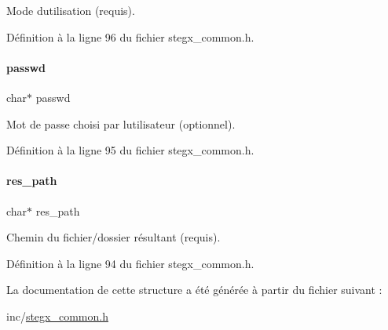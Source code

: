 Mode d\textquotesingle{}utilisation (requis). 

Définition à la ligne 96 du fichier stegx\+\_\+common.\+h.

\mbox{\label{a00142_a3b8cb37fa26cdca2b7460e14facd9ec0}} 
\paragraph{\texorpdfstring{passwd}{passwd}}
{\footnotesize\ttfamily char$\ast$ passwd}

Mot de passe choisi par l\textquotesingle{}utilisateur (optionnel). 

Définition à la ligne 95 du fichier stegx\+\_\+common.\+h.

\mbox{\label{a00142_a1db5ca4f9cb9c5b56b92a0181f92ec63}} 
\paragraph{\texorpdfstring{res\+\_\+path}{res\_path}}
{\footnotesize\ttfamily char$\ast$ res\+\_\+path}

Chemin du fichier/dossier résultant (requis). 

Définition à la ligne 94 du fichier stegx\+\_\+common.\+h.



La documentation de cette structure a été générée à partir du fichier suivant \+:\begin{DoxyCompactItemize}
\item 
inc/\hyperlink{a00008}{stegx\+\_\+common.\+h}\end{DoxyCompactItemize}
